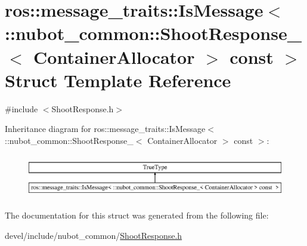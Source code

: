 \hypertarget{structros_1_1message__traits_1_1IsMessage_3_01_1_1nubot__common_1_1ShootResponse___3_01ContainerAllocator_01_4_01const_01_01_4}{\section{ros\-:\-:message\-\_\-traits\-:\-:Is\-Message$<$ \-:\-:nubot\-\_\-common\-:\-:Shoot\-Response\-\_\-$<$ Container\-Allocator $>$ const $>$ Struct Template Reference}
\label{structros_1_1message__traits_1_1IsMessage_3_01_1_1nubot__common_1_1ShootResponse___3_01ContainerAllocator_01_4_01const_01_01_4}
}


{\ttfamily \#include $<$Shoot\-Response.\-h$>$}

Inheritance diagram for ros\-:\-:message\-\_\-traits\-:\-:Is\-Message$<$ \-:\-:nubot\-\_\-common\-:\-:Shoot\-Response\-\_\-$<$ Container\-Allocator $>$ const $>$\-:\begin{figure}[H]
\begin{center}
\leavevmode
\includegraphics[height=1.941074cm]{structros_1_1message__traits_1_1IsMessage_3_01_1_1nubot__common_1_1ShootResponse___3_01ContainerAllocator_01_4_01const_01_01_4}
\end{center}
\end{figure}


The documentation for this struct was generated from the following file\-:\begin{DoxyCompactItemize}
\item 
devel/include/nubot\-\_\-common/\hyperlink{ShootResponse_8h}{Shoot\-Response.\-h}\end{DoxyCompactItemize}
